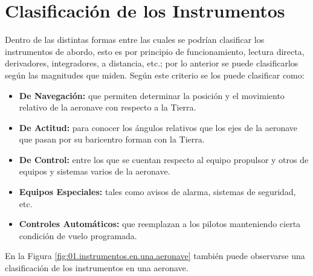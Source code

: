 





\section{Clasificaci\'on de los Instrumentos}
\label{sec:01.02.clasificacion.instrumentos}

Dentro de las distintas formas entre las cuales se podr\'ian clasificar los instrumentos de abordo, esto es por principio de funcionamiento, lectura directa, derivadores, integradores, a distancia, etc.; por lo anterior se puede clasificarlos seg\'un las magnitudes que miden. Seg\'un este criterio se los puede clasificar como:

\begin{itemize}
\item {\bf De Navegaci\'on:} que permiten determinar la posici\'on y el movimiento relativo de la aeronave con respecto a la Tierra.
\item {\bf De Actitud:} para conocer los \'angulos relativos que los ejes de la aeronave que pasan por su baricentro forman con la Tierra.
\item {\bf De Control:} entre los que se cuentan respecto al equipo propulsor y otros de equipos y sistemas varios de la aeronave.
\item {\bf Equipos Especiales:} tales como avisos de alarma, sistemas de seguridad, etc. 
\item {\bf Controles Autom\'aticos:} que reemplazan a los pilotos manteniendo cierta condici\'on de vuelo programada.
\end{itemize}

En la Figura \ref{fig:01.instrumentos.en.una.aeronave} tambi\'en puede observarse una clasificaci\'on de los instrumentos en una aeronave.

